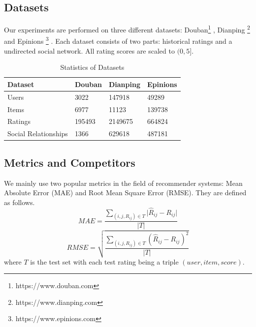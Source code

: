 \documentclass{article}
\begin{document}
\subsection{Datasets}
Our experiments are performed on three different datasets: Douban\footnote{https://www.douban.com} \cite{doubands}, 
Dianping \footnote{https://www.dianping.com} \cite{dianpingds} and Epinions \footnote{https://www.epinions.com} \cite{epinionsds}. Each dataset consists of two parts: historical ratings and a undirected social network.
All rating scores are scaled to $(0, 5]$.
\begin{table}[h]
  \caption{Statistics of Datasets}
  \label{sample-table}
  \centering
  \begin{tabular}{llll}
    \toprule
    Dataset  & Douban  & Dianping & Epinions \\
    \midrule
    Users & 3022     & 147918     & 49289  \\
    Items & 6977     & 11123      & 139738 \\
    Ratings & 195493 & 2149675    & 664824 \\
    Social Relationships & 1366 & 629618 & 487181 \\
    \bottomrule
  \end{tabular}
\end{table}
\subsection{Metrics and Competitors}
We mainly use two popular metrics in the field of recommender systems: 
Mean Absolute Error (MAE) and Root Mean Square Error (RMSE). They are defined as follows.
$$
MAE = \frac{\sum_{(i, j, R_{ij}) \in T} \vert\hat{R}_{ij} - R_{ij}\vert}{\vert T \vert}
$$
$$
RMSE = \sqrt{ \frac{\sum_{(i, j, R_{ij}) \in T} (\hat{R}_{ij} - R_{ij})^2}{\vert T \vert} }
$$
where $T$ is the test set with each test rating being a triple $(user, item, score)$.
\end{document}
